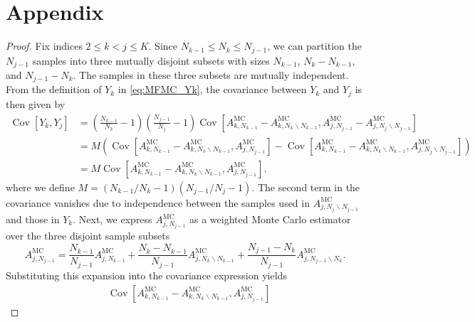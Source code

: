 \section{Appendix}\label{sec:Appendix}
\begin{proof}
Fix indices $2\le k<j\le K$. Since $N_{k-1}\le N_k\le N_{j-1}$, we can partition the $N_{j-1}$ samples into three mutually disjoint subsets with sizes $N_{k-1}$, $N_{k}-N_{k-1}$, and $N_{j-1} - N_{k}$. The samples in these three subsets are mutually independent. From the definition of $Y_k$ in \eqref{eq:MFMC_Yk},  the covariance between $Y_k$ and $Y_j$ is then given by
\begin{align*}
    \operatorname{Cov}\left[Y_k,Y_j\right] &= \left(\frac{N_{k-1}}{N_k}-1\right) \left(\frac{N_{j-1}}{N_j}-1\right)\operatorname{Cov}\left[A_{k, N_{k-1}}^{\text{MC}} - A_{k,N_{k}\backslash N_{k-1}}^{\text{MC}}, A_{j,N_{j-1}}^{\text{MC}} - A_{j,N_{j}\backslash N_{j-1}}^{\text{MC}}\right]\\
    & = M \left(\operatorname{Cov}\left[A_{k,N_{k-1}}^{\text{MC}} - A_{k,N_{k}\backslash N_{k-1}}^{\text{MC}}, A_{j,N_{j-1}}^{\text{MC}}\right] - \operatorname{Cov}\left[A_{k,N_{k-1}}^{\text{MC}} - A_{k,N_{k}\backslash N_{k-1}}^{\text{MC}}, A_{j,N_{j}\backslash N_{j-1}}^{\text{MC}}\right] \right)\\
    & = M \operatorname{Cov}\left[A_{k,N_{k-1}}^{\text{MC}} - A_{k,N_{k}\backslash N_{k-1}}^{\text{MC}}, A_{j,N_{j-1}}^{\text{MC}}\right].
\end{align*}
where we define $M = (N_{k-1}/N_k-1) (N_{j-1}/N_j-1)$. The second term in the covariance vanishes due to independence between the samples used in $A_{j,N_{j}\backslash N_{j-1}}^{\text{MC}}$ and those in $Y_k$. Next, we express $A_{j,N_{j-1}}^{\text{MC}}$ as a weighted Monte Carlo estimator over the three disjoint sample subsets
%
\begin{equation*}
    A_{j,N_{j-1}}^{\text{MC}} = \frac{N_{k-1}}{N_{j-1}}A_{j,N_{k-1}}^{\text{MC}} + \frac{N_k - N_{k-1}}{N_{j-1}} A_{j,N_{k}\backslash N_{k-1}}^{\text{MC}} + \frac{N_{j-1} - N_k}{N_{j-1}} A_{j,N_{j-1}\backslash N_{k}}^{\text{MC}}.
\end{equation*}
%
Substituting this expansion into the covariance expression yields
%
\begin{align*}
    &\operatorname{Cov}\left[A_{k,N_{k-1}}^{\text{MC}} - A_{k,N_{k}\backslash N_{k-1}}^{\text{MC}}, A_{j,N_{j-1}}^{\text{MC}}\right]

\end{align*}
\end{proof}
